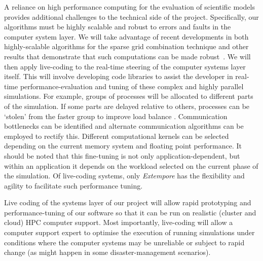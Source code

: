 A reliance on high performance computing for the evaluation of
scientific models provides additional challenges to the technical side
of the project. Specifically, our algorithms must be highly scalable
and robust to errors and faults in the computer system layer. 
We will take advantage of 
recent developments in both highly-scalable algorithms
for the sparse grid combination
technique \cite{sgctalg15,pdsec15extsgctalg} and other results that demonstrate that such
computations can be made
robust~\parencite{HardingHLS2015,AliEtal2015,Ali11022016}. We will then apply live-coding to the real-time steering of the computer
systems layer itself. This will involve developing code libraries to assist the developer in
real-time performance-evaluation and tuning of these complex and highly
parallel simulations. For example, groups of processes will be
allocated to different parts of the simulation. If some parts are
delayed relative to others, processes can be `stolen' from the faster
group to improve load balance \cite{parSGCT16}. Communication
bottlenecks can be identified and alternate communication algorithms
can be employed to rectify this.  Different computational kernels can
be selected depending on the current memory system and floating point
performance.  It should be noted that this fine-tuning is not only
application-dependent, but within an application it depends on the
workload selected on the current
phase of the simulation. Of live-coding systems, only \emph{Extempore} has
the flexibility and agility to facilitate such performance
tuning.


\iffalse
In this project we will leverage on-demand compute resources, such as
the Amazon AWS cloud~\parencite{amazonAws} and the National Compute
Infrastructure NCI Cloud~\parencite{nciCloud}. Using these cloud
services will further improve the project's ability to deliver timely
results in high-pressure and time-critical decision making scenarios.

Once again, we emphasise that our approach to live coding of test
software is a novel aspect of our methodology. 
\fi




Live coding of the systems layer of our project will
allow rapid prototyping and performance-tuning of our software so that
it can be run on realistic (cluster and cloud) HPC computer
support. Most importantly, live-coding will allow a computer support
expert to optimise the execution of running simulations under
conditions where the computer systems may be unreliable or subject to
rapid change (as might happen in some disaster-management scenarios).\\

